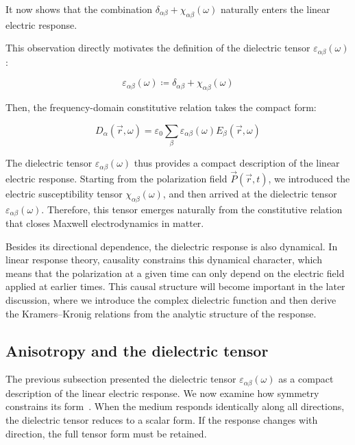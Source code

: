 It now shows that the combination $\delta_{\alpha\beta}+\chi_{\alpha\beta}(\omega)$ naturally enters the linear electric response.

This observation directly motivates the definition of the dielectric tensor $\varepsilon_{\alpha\beta}(\omega)$:

\begin{equation}
    \varepsilon_{\alpha\beta}(\omega)
    \coloneqq\delta_{\alpha\beta}+\chi_{\alpha\beta}(\omega)
\label{dielectric_tensor_definition}
\end{equation}

Then, the frequency-domain constitutive relation takes the compact form:

\begin{equation}
    D_\alpha(\vec{r},\omega)
    = \varepsilon_0\sum_\beta\varepsilon_{\alpha\beta}(\omega)E_\beta(\vec{r},\omega)
\label{frequency_domain_constitutive_relation_with_dielectric_tensor}
\end{equation}

The dielectric tensor $\varepsilon_{\alpha\beta}(\omega)$ thus provides a compact description of the linear electric response.
Starting from the polarization field $\vec{P}(\vec{r},t)$,
we introduced the electric susceptibility tensor $\chi_{\alpha\beta}(\omega)$,
and then arrived at the dielectric tensor $\varepsilon_{\alpha\beta}(\omega)$.
Therefore, this tensor emerges naturally from the constitutive relation that closes Maxwell electrodynamics in matter.

Besides its directional dependence, the dielectric response is also dynamical.
In linear response theory, causality constrains this dynamical character,
which means that the polarization at a given time can only depend on the electric field applied at earlier times.
This causal structure will become important in the later discussion,
where we introduce the complex dielectric function and then derive the Kramers--Kronig relations from the analytic structure of the response.

\subsection{Anisotropy and the dielectric tensor}

The previous subsection presented the dielectric tensor $\varepsilon_{\alpha\beta}(\omega)$ as a compact description of the linear electric response.
We now examine how symmetry constrains its form~\cite{capper2019optical}.
When the medium responds identically along all directions, the dielectric tensor reduces to a scalar form.
If the response changes with direction, the full tensor form must be retained.

